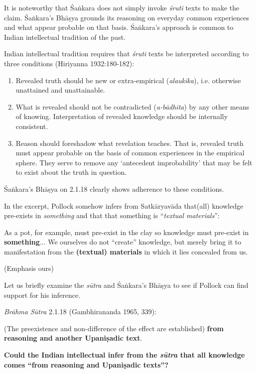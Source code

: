 It is noteworthy that Śaṅkara does not simply invoke {\sl śruti} texts to make the claim.  Śaṅkara's Bhāṣya grounds its reasoning on everyday common experiences and what appear probable on that basis.  Śaṅkara's approach is common to Indian intellectual tradition of the past.

Indian intellectual tradition requires that {\sl śruti} texts be interpreted according to three conditions (Hiriyanna 1932:180-182):
\begin{enumerate}
\item Revealed truth should be new or extra-empirical ({\sl alaukika}), i.e. otherwise unattained and unattainable.

\item What is revealed should not be contradicted ({\sl a-bādhita}) by any other means of knowing. Interpretation of revealed knowledge should be internally consistent.

\item Reason should foreshadow what revelation teaches. That is, revealed truth must appear probable on the basis of common experiences in the empirical sphere. They serve to remove any `antecedent improbability' that may be felt to exist about the truth in question.
\end{enumerate}

Śaṅkara's Bhāṣya on 2.1.18 clearly shows adherence to these conditions.

In the excerpt, Pollock somehow infers from Satkāryavāda that(all) knowledge pre-exists in {\sl something} and that that something is ``{\sl textual materials}'':
\begin{myquote}
As a pot, for example, must pre-exist in the clay so knowledge must pre-exist in {\bf something}... We ourselves do not ``create'' knowledge, but merely bring it to manifestation from the {\bf (textual) materials} in which it lies concealed from us. 

\hfill (Emphasis ours)
\end{myquote}

Let us briefly examine the {\sl sūtra} and Śaṅkara's Bhāṣya to see if Pollock can find support for his inference.

{\sl Brāhma Sūtra} 2.1.18 (Gambhirananda 1965, 339):
\begin{myquote}
(The preexistence and non-difference of the effect are established) \textbf{from reasoning and another Upaniṣadic text}.
\end{myquote}

\textbf{Could the Indian intellectual infer from the {{\sl\bfseries sūtra}\relax} that all knowledge comes ``from reasoning and Upaniṣadic texts''?}

